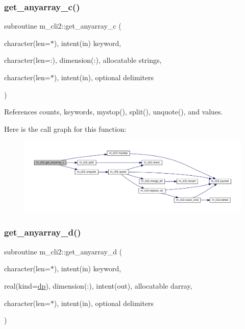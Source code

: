 \subsubsection{\texorpdfstring{get\+\_\+anyarray\+\_\+c()}{get\_anyarray\_c()}}
{\footnotesize\ttfamily subroutine m\+\_\+cli2\+::get\+\_\+anyarray\+\_\+c (\begin{DoxyParamCaption}\item[{character(len=$\ast$), intent(in)}]{keyword,  }\item[{character(len=\+:), dimension(\+:), allocatable}]{strings,  }\item[{character(len=$\ast$), intent(in), optional}]{delimiters }\end{DoxyParamCaption})\hspace{0.3cm}{\ttfamily [private]}}



References counts, keywords, mystop(), split(), unquote(), and values.

Here is the call graph for this function\+:
\nopagebreak
\begin{figure}[H]
\begin{center}
\leavevmode
\includegraphics[width=350pt]{namespacem__cli2_a448e8e24406f4bdbc14f26a940cbbc2c_cgraph}
\end{center}
\end{figure}
\mbox{\label{namespacem__cli2_aaede1f28172778cf45f4b6c04967bbbd}} 
\subsubsection{\texorpdfstring{get\+\_\+anyarray\+\_\+d()}{get\_anyarray\_d()}}
{\footnotesize\ttfamily subroutine m\+\_\+cli2\+::get\+\_\+anyarray\+\_\+d (\begin{DoxyParamCaption}\item[{character(len=$\ast$), intent(in)}]{keyword,  }\item[{real(kind=\mbox{\hyperlink{namespacem__cli2_acf83f1963cf6a56ad0221cfcf5402440}{dp}}), dimension(\+:), intent(out), allocatable}]{darray,  }\item[{character(len=$\ast$), intent(in), optional}]{delimiters }\end{DoxyParamCaption})\hspace{0.3cm}{\ttfamily [private]}}



